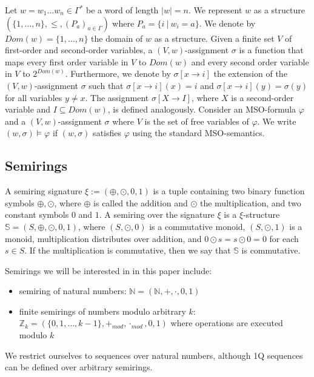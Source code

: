 \documentclass[12pt]{article}
\theoremstyle{definition}
\begin{document}
Let $w = w_1\ldots w_n \in \Gamma^*$ be a word of length $|w| = n$. We represent $w$ as a structure $(\{1,\ldots,n\}, \leq, (P_a)_{a \in \Gamma})$ where $P_a = \{i \ | \ w_i = a\}$. We denote by $Dom(w) = \{1,\ldots,n\}$ the domain of $w$ as a structure. Given a finite set $V$ of first-order and second-order variables, a $(V,w)$-assignment $\sigma$ is a function that maps every first order variable in $V$ to $Dom(w)$ and every second order variable in $V$ to $2^{Dom(w)}$. Furthermore, we denote by $\sigma[x \rightarrow i]$ the extension of the $(V,w)$-assignment $\sigma$ such that $\sigma[x \rightarrow i](x) = i$ and $\sigma[x \rightarrow i](y) = \sigma(y)$ for all variables $y \ne x$. The assignment $\sigma[X \rightarrow I]$, where $X$ is a second-order variable and $I \subseteq Dom(w)$, is defined analogously. Consider an MSO-formula $\varphi$ and a $(V,w)$-assignment $\sigma$ where $V$ is the set of free variables of $\varphi$. We write $(w, \sigma) \models \varphi$ if $(w, \sigma)$ satisfies $\varphi$ using the standard MSO-semantics.

\subsection{Semirings}

A semiring signature $\xi := (\oplus, \odot, 0, 1)$ is a tuple containing two binary function symbols $\oplus, \odot$, where $\oplus$ is called the addition and $\odot$ the multiplication, and two constant symbols $0$ and $1$. A semiring over the signature $\xi$ is a $\xi$-structure $\mathbb{S} = (S, \oplus, \odot, 0, 1)$, where $(S, \odot, 0)$ is a commutative monoid, $(S, \odot, 1)$ is a monoid, multiplication distributes over addition, and $0 \odot s = s \odot 0 = 0$ for each $s \in S$. If the multiplication is commutative, then we say that $\mathbb{S}$ is commutative.

Semirings we will be interested in in this paper include:

\begin{itemize}
    \item semiring of natural numbers: $\mathbb{N} = (\mathbb{N}, +, \cdot, 0, 1)$
    \item finite semirings of numbers modulo arbitrary $k$: $ \mathbb{Z}_k = (\{0,1,\ldots,k-1\}, +_{mod}, \cdot_{mod}, 0, 1)$ where operations are executed modulo $k$
\end{itemize}

We restrict ourselves to sequences over natural numbers, although 1Q sequences can be defined over arbitrary semirings.
\end{document}
